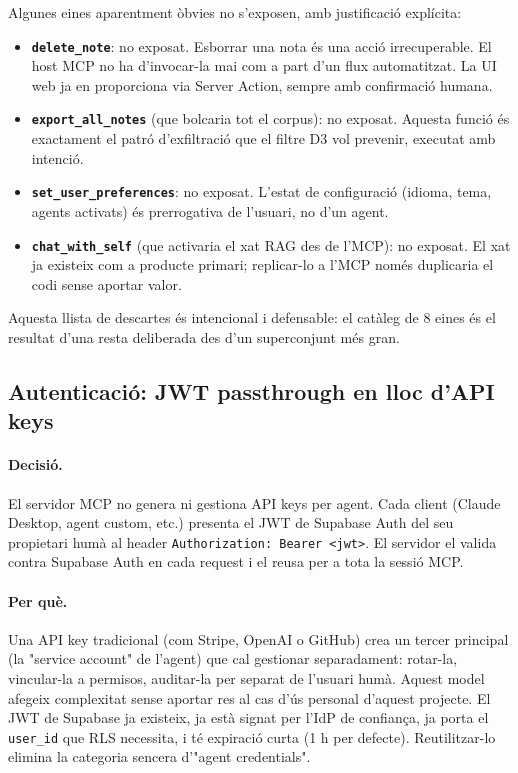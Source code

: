 Algunes eines aparentment òbvies no s'exposen, amb justificació explícita:

\begin{itemize}
    \item \textbf{\texttt{delete\_note}}: no exposat. Esborrar una nota és una acció irrecuperable. El host MCP no ha d'invocar-la mai com a part d'un flux automatitzat. La UI web ja en proporciona via Server Action, sempre amb confirmació humana.
    \item \textbf{\texttt{export\_all\_notes}} (que bolcaria tot el corpus): no exposat. Aquesta funció és exactament el patró d'exfiltració que el filtre D3 vol prevenir, executat amb intenció.
    \item \textbf{\texttt{set\_user\_preferences}}: no exposat. L'estat de configuració (idioma, tema, agents activats) és prerrogativa de l'usuari, no d'un agent.
    \item \textbf{\texttt{chat\_with\_self}} (que activaria el xat RAG des de l'MCP): no exposat. El xat ja existeix com a producte primari; replicar-lo a l'MCP només duplicaria el codi sense aportar valor.
\end{itemize}

Aquesta llista de descartes és intencional i defensable: el catàleg de 8 eines és el resultat d'una resta deliberada des d'un superconjunt més gran.

\subsection{Autenticació: JWT passthrough en lloc d'API keys}

\paragraph{Decisió.} El servidor MCP no genera ni gestiona API keys per agent. Cada client (Claude Desktop, agent custom, etc.) presenta el JWT de Supabase Auth del seu propietari humà al header \texttt{Authorization: Bearer <jwt>}. El servidor el valida contra Supabase Auth en cada request i el reusa per a tota la sessió MCP.

\paragraph{Per què.} Una API key tradicional (com Stripe, OpenAI o GitHub) crea un tercer principal (la "service account" de l'agent) que cal gestionar separadament: rotar-la, vincular-la a permisos, auditar-la per separat de l'usuari humà. Aquest model afegeix complexitat sense aportar res al cas d'ús personal d'aquest projecte. El JWT de Supabase ja existeix, ja està signat per l'IdP de confiança, ja porta el \texttt{user\_id} que RLS necessita, i té expiració curta (1 h per defecte). Reutilitzar-lo elimina la categoria sencera d'"agent credentials".

